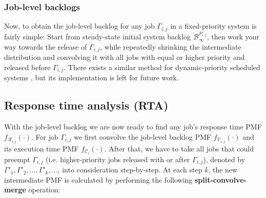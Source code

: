 \documentclass[a4paper,oneside]{csthesis}
\begin{document}
\subsubsection{Job-level backlogs}
Now, to obtain the job-level backlog for any job $\Gamma_{i,j}$ in a fixed-priority system is fairly simple: Start from steady-state initial system backlog $\mathcal{B}_\infty^{P_{i,j}}$, then work your way towards the release of $\Gamma_{i,j}$, while repeatedly shrinking the intermediate distribution and convolving it with all jobs with equal or higher priority and released before $\Gamma_{i,j}$. There exists a similar method for dynamic-priority scheduled systems \cite{diaz2002stochastic}, but its implementation is left for future work.

\subsection{Response time analysis (RTA)}
\label{subsec:job-rta}
With the job-level backlog we are now ready to find any job's response time PMF $f_{\mathcal{R}_{i,j}}(\cdot)$. For job $\Gamma_{i,j}$ we first convolve the job-level backlog PMF $f_{\mathcal{V}_{i,j}}(\cdot)$ and its execution time PMF $f_{\mathcal{C}_{i}}(\cdot)$. After that, we have to take all jobs that could preempt $\Gamma_{i,j}$ (i.e. higher-priority jobs released with or after $\Gamma_{i,j}$), denoted by $\Gamma'_1, \Gamma'_2, ..., \Gamma'_k, ...$, into consideration step-by-step. At each step $k$, the new intermediate PMF is calculated by performing the following \textbf{split-convolve-merge} operation:
\end{document}
